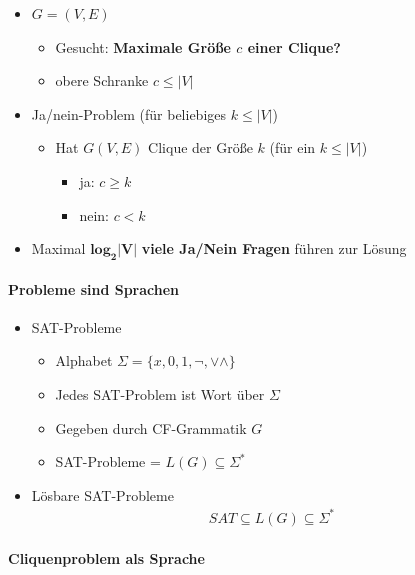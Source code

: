 \documentclass{scrartcl}
\begin{document}
\begin{itemize}
	\item $G = (V,E)$
	\begin{itemize}
		\item Gesucht: \textbf{Maximale Größe $c$ einer Clique?}
		\item obere Schranke $c \leq |V|$
	\end{itemize}
	\item Ja/nein-Problem (für beliebiges $k \leq |V|$)
	\begin{itemize}
		\item Hat $G(V,E)$ Clique der Größe $k$ (für ein $k \leq |V|$)
		\begin{itemize}
			\item ja: $c \geq k$
			\item nein: $c < k$
		\end{itemize}
	\end{itemize}
	\item Maximal $\mathbf{log_2|V|}$ \textbf{viele Ja/Nein Fragen} führen zur Lösung
\end{itemize}

\paragraph{Probleme sind Sprachen}

\begin{itemize}
	\item SAT-Probleme
	\begin{itemize}
		\item Alphabet $\Sigma = \{ x,0,1,\neg,\vee\wedge \}$
		\item Jedes SAT-Problem ist Wort über $\Sigma$
		\item Gegeben durch CF-Grammatik $G$
		\item SAT-Probleme = $L(G) \subseteq \Sigma^*$
	\end{itemize}
	\item Lösbare SAT-Probleme
	\begin{align*}
		SAT \subseteq L(G) \subseteq \Sigma^*
	\end{align*}
\end{itemize}

\paragraph{Cliquenproblem als Sprache}
\end{document}
